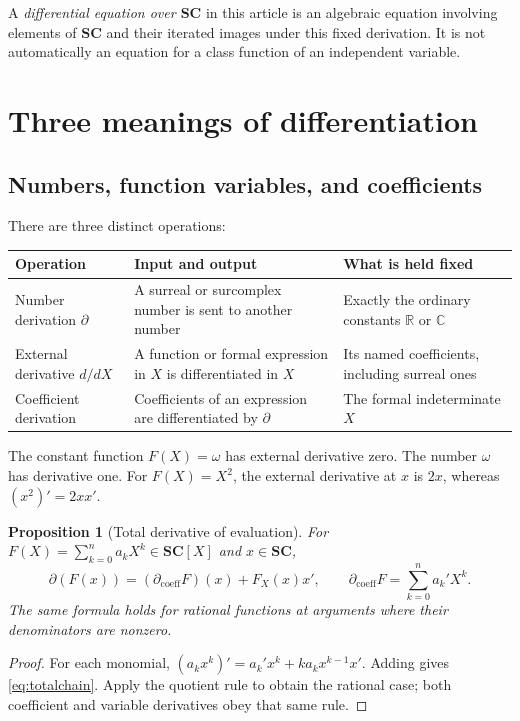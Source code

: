 \documentclass[11pt,letterpaper]{article}
\numberwithin{equation}{section}
\newtheorem{proposition}[proposition]{Proposition}
\theoremstyle{definition}
\theoremstyle{remark}
\newcommand{\SC}{\mathbf{SC}}
\newcommand{\R}{\mathbb R}
\newcommand{\C}{\mathbb C}
\newcommand{\der}{\partial}
\begin{document}
A \emph{differential equation over $\SC$} in this article is an algebraic equation involving elements of $\SC$ and their iterated images under this fixed derivation. It is not automatically an equation for a class function of an independent variable.

\section{Three meanings of differentiation}\label{sec:derivatives}

\subsection{Numbers, function variables, and coefficients}
There are three distinct operations:
\begin{center}\small
\begin{tabular}{L{0.22\textwidth}L{0.34\textwidth}L{0.34\textwidth}}
\toprule
Operation & Input and output & What is held fixed\\
\midrule
Number derivation $\der$ & A surreal or surcomplex number is sent to another number & Exactly the ordinary constants $\R$ or $\C$\\
External derivative $d/dX$ & A function or formal expression in $X$ is differentiated in $X$ & Its named coefficients, including surreal ones\\
Coefficient derivation & Coefficients of an expression are differentiated by $\der$ & The formal indeterminate $X$\\
\bottomrule
\end{tabular}
\end{center}
The constant function $F(X)=\omega$ has external derivative zero. The number $\omega$ has derivative one. For $F(X)=X^2$, the external derivative at $x$ is $2x$, whereas $(x^2)'=2xx'$.

\begin{proposition}[Total derivative of evaluation]\label{prop:totalchain}
For $F(X)=\sum_{k=0}^n a_kX^k\in\SC[X]$ and $x\in\SC$,
\begin{equation}\label{eq:totalchain}
 \der(F(x))=(\der_{\mathrm{coeff}}F)(x)+F_X(x)x',
 \qquad \der_{\mathrm{coeff}}F=\sum_{k=0}^n a_k'X^k.
\end{equation}
The same formula holds for rational functions at arguments where their denominators are nonzero.
\end{proposition}
\begin{proof}
For each monomial, $(a_kx^k)'=a_k'x^k+ka_kx^{k-1}x'$. Adding gives \eqref{eq:totalchain}. Apply the quotient rule to obtain the rational case; both coefficient and variable derivatives obey that same rule.
\end{proof}
\end{document}
